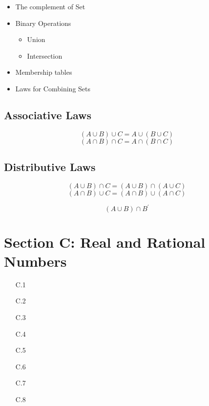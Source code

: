 \begin{itemize}
\item The complement of Set
\item Binary Operations
\begin{itemize}
\item Union
\item Intersection
\end{itemize}
\item Membership tables
\item Laws for Combining Sets
\end{itemize}




\subsection*{Associative Laws}
\[ (A \cup B) \cup C =  A \cup (B \cup C)  \]
\[ (A \cap B) \cap C =  A \cap (B \cap C)  \]

\subsection*{Distributive Laws}
\[ (A \cup B) \cap C =  (A \cup B) \cap (A \cup C)  \]
\[ (A \cap B) \cup C =  (A \cap B) \cup (A \cap C)  \]


\[ (A \cup B) \cap B^{\prime} \]
\section*{Section C: Real and Rational Numbers}
\begin{itemize}
\item[C.1]
\item[C.2]
\item[C.3]
\item[C.4]
\item[C.5]
\item[C.6]
\item[C.7]
\item[C.8]
\end{itemize}
\newpage
